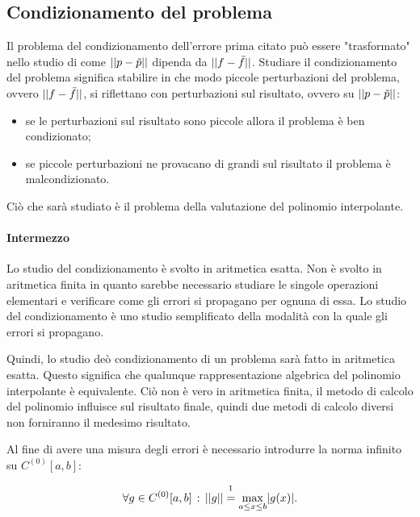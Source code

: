 \subsection{Condizionamento del problema}\label{ssec:condProbApproxfun}
Il problema del condizionamento dell'errore prima citato può essere "trasformato" nello studio di come $||p-\Tilde{p}||$ dipenda da $||f-\Tilde{f}||$. Studiare il condizionamento del problema significa stabilire in che modo piccole perturbazioni del problema, ovvero $||f-\Tilde{f}||$, si riflettano con perturbazioni sul risultato, ovvero su $||p-\Tilde{p}||$:
\begin{itemize}
    \item se le perturbazioni sul risultato sono piccole allora il problema è ben condizionato;
    \item se piccole perturbazioni ne provacano di grandi sul risultato il problema è malcondizionato.
\end{itemize}

Ciò che sarà studiato è il problema della valutazione del polinomio interpolante.

\paragraph{Intermezzo}{Lo studio del condizionamento è svolto in aritmetica esatta. Non è svolto in aritmetica finita in quanto sarebbe necessario studiare le singole operazioni elementari e verificare come gli errori si propagano per ognuna di essa. Lo studio del condizionamento è uno studio semplificato della modalità con la quale gli errori si propagano.

Quindi, lo studio deò condizionamento di un problema sarà fatto in aritmetica esatta. Questo significa che qualunque rappresentazione algebrica del polinomio interpolante è equivalente. Ciò non è vero in aritmetica finita, il metodo di calcolo del polinomio influisce sul risultato finale, quindi due metodi di calcolo diversi non forniranno il medesimo risultato.}

Al fine di avere una misura degli errori è necessario introdurre la norma infinito su $C^{(0)}[a,b]:$

\begin{equation}\label{eq:defNormaInfG}
    \forall g\in C^{(0)}[a,b]\,:\, ||g||\overset{\footnotemark}{=}\underset{a\leq x\leq b}{\max}|g(x)|.
\end{equation}

